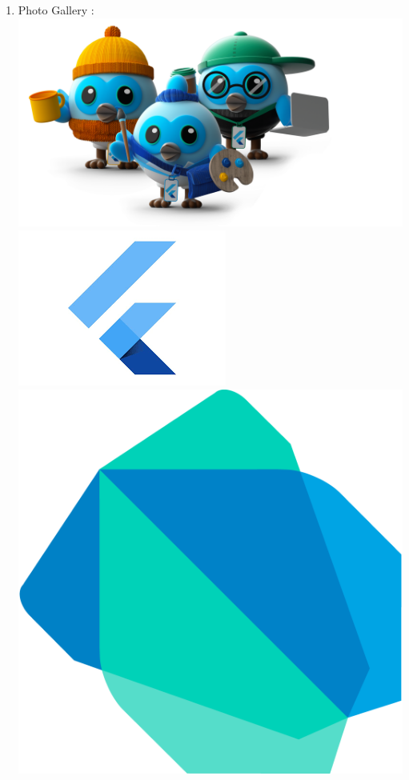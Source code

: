\documentclass[11pt,a4paper,oneside,openright]{report}
\begin{document}
{{\begin{enumerate}
\item Photo Gallery :\\
\hspace{0.2in}
\includegraphics[scale=0.15]{dash.png}\\
\hfill \includegraphics[scale=0.8]{flutter.png} \hfill\\ 
\hfill \includegraphics[scale=0.14]{dart.png} \hfill\\




\end{enumerate}}}
\end{document}
